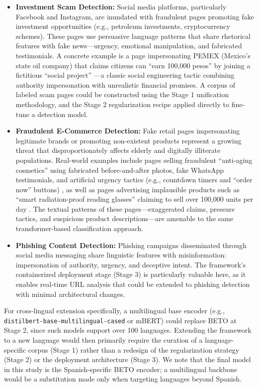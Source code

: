 \documentclass[informatics,article,submit,pdftex,moreauthors]{Definitions/mdpi}
\begin{document}
\begin{itemize}
    \item \textbf{Investment Scam Detection:} Social media platforms, particularly Facebook and Instagram, are inundated with fraudulent pages promoting fake investment opportunities (e.g., petroleum investments, cryptocurrency schemes). These pages use persuasive language patterns that share rhetorical features with fake news—urgency, emotional manipulation, and fabricated testimonials. A concrete example is a page impersonating PEMEX (Mexico's state oil company) that claims citizens can ``earn 100,000 pesos'' by joining a fictitious ``social project'' \citep{scam2025investment}—a classic social engineering tactic combining authority impersonation with unrealistic financial promises. A corpus of labeled scam pages could be constructed using the Stage 1 unification methodology, and the Stage 2 regularization recipe applied directly to fine-tune a detection model.
    \item \textbf{Fraudulent E-Commerce Detection:} Fake retail pages impersonating legitimate brands or promoting non-existent products represent a growing threat that disproportionately affects elderly and digitally illiterate populations. Real-world examples include pages selling fraudulent ``anti-aging cosmetics'' using fabricated before-and-after photos, fake WhatsApp testimonials, and artificial urgency tactics (e.g., countdown timers and ``order now'' buttons) \citep{scam2025cosmetics}, as well as pages advertising implausible products such as ``smart radiation-proof reading glasses'' claiming to sell over 100,000 units per day \citep{scam2025ecommerce}. The textual patterns of these pages—exaggerated claims, pressure tactics, and suspicious product descriptions—are amenable to the same transformer-based classification approach.
    \item \textbf{Phishing Content Detection:} Phishing campaigns disseminated through social media messaging share linguistic features with misinformation: impersonation of authority, urgency, and deceptive intent. The framework's containerized deployment stage (Stage 3) is particularly valuable here, as it enables real-time URL analysis that could be extended to phishing detection with minimal architectural changes.
\end{itemize}

For cross-lingual extension specifically, a multilingual base encoder (e.g., \texttt{distilbert\allowbreak-base\allowbreak-multilingual\allowbreak-cased} or mBERT) could replace BETO at Stage 2, since such models support over 100 languages. Extending the framework to a new language would then primarily require the curation of a language-specific corpus (Stage 1) rather than a redesign of the regularization strategy (Stage 2) or the deployment architecture (Stage 3). We note that the final model in this study is the Spanish-specific BETO encoder; a multilingual backbone would be a substitution made only when targeting languages beyond Spanish.
\end{document}
